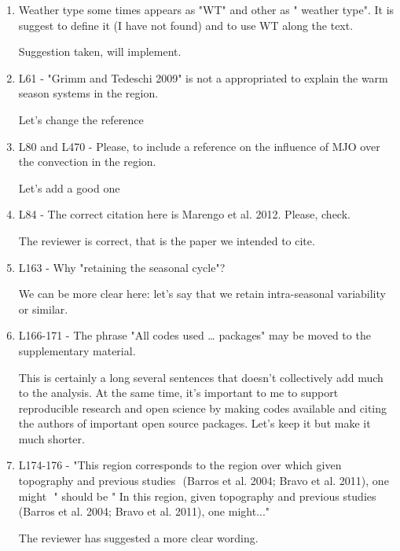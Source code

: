 \documentclass{article}
\newenvironment{answer}{\begin{mdframed}}{\end{mdframed}}
\begin{document}
\begin{enumerate}
	\item Weather type some times appears as "WT" and other as " weather type".  It is suggest to define it (I have not found) and to use WT along the text.
	\begin{answer}
		Suggestion taken, will implement.
	\end{answer}
	\item L61 - "Grimm and Tedeschi 2009"  is not a appropriated to explain the warm season systems in the region.
	\begin{answer}
		Let's change the reference
	\end{answer}
	\item L80 and L470 - Please, to include a reference on the influence of MJO over the convection in the region.
	\begin{answer}
		Let's add a good one
	\end{answer}
	\item L84 - The correct citation here is Marengo et al. 2012. Please, check.
	\begin{answer}
		The reviewer is correct, that is the paper we intended to cite.
	\end{answer}
	\item L163 - Why "retaining the seasonal cycle"?
	\begin{answer}
		We can be more clear here: let's say that we retain intra-seasonal variability or similar.
	\end{answer}
	\item L166-171 - The phrase "All codes used … packages" may be moved to the supplementary material.
	\begin{answer}
		This is certainly a long several sentences that doesn't collectively add much to the analysis.
		At the same time, it's important to me to support reproducible research  and open science by making codes available and citing the authors of important open source packages.
		Let's keep it but make it much shorter.
	\end{answer}
	\item L174-176 - "This region corresponds to the region over which given topography and previous studies  (Barros et al. 2004; Bravo et al. 2011), one might  " should be " In this region, given topography and previous studies  (Barros et al. 2004; Bravo et al. 2011), one might..."
	\begin{answer}
		The reviewer has suggested a more clear wording.
	\end{answer}

\end{enumerate}
\end{document}
